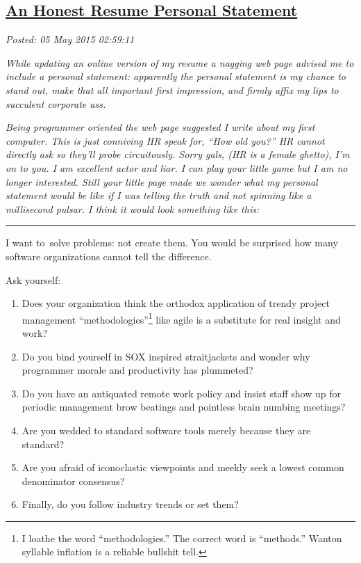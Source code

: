 %

\subsection*{\href{https://bakerjd99.wordpress.com/2015/05/04/an-honest-resume-personal-statement/}{An Honest Resume Personal Statement}}


\noindent\emph{Posted: 05 May 2015 02:59:11}
\vspace{6pt}

\emph{While updating an online version of my resume a nagging web page
advised me to include a personal statement: apparently the personal
statement is my chance to stand out, make that all important first
impression, and firmly affix my lips to succulent corporate ass.}

\emph{Being programmer oriented the web page suggested I write about my
first computer. This is just conniving HR speak for, ``How old you?'' HR
cannot directly ask so they'll probe circuitously. Sorry gals, (HR is a
female ghetto), I'm on to you. I am excellent actor and liar. I can play
your little game but I am no longer interested. Still your little page
made we wonder what my personal statement would be like if I was telling
the truth and not spinning like a millisecond pulsar. I think it would
look something like this:}

\begin{center}\rule{0.5\linewidth}{\linethickness}\end{center}

I want to~solve problems: not create them. You would be surprised how
many software organizations cannot tell the difference.

Ask yourself:

\begin{enumerate}
\itemsep2pt\parskip0pt
\item
  Does your organization think the orthodox application of trendy
  project management
  ``methodologies''\footnote{I loathe the word ``methodologies.'' The correct word is ``methods.''
  Wanton syllable inflation is a reliable bullshit tell.} %
  like agile is a substitute for real insight and work?
\item
  Do you bind yourself in SOX inspired straitjackets and wonder why
  programmer morale and productivity has plummeted?
\item
  Do you have an antiquated remote work policy and insist staff show up
  for periodic management brow beatings and pointless brain numbing
  meetings?
\item
  Are you wedded to standard software tools merely because they are
  standard?
\item
  Are you afraid of iconoclastic viewpoints and meekly seek a lowest
  common denominator consensus?
\item
  Finally, do you follow industry trends or set them?
\end{enumerate}

